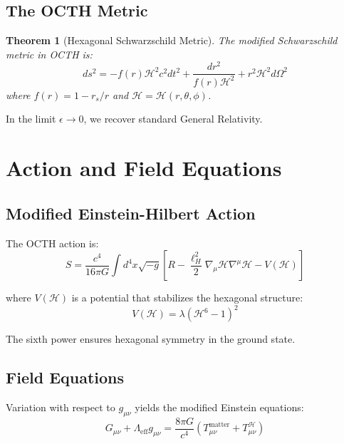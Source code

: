 \documentclass[12pt,a4paper]{article}
\newtheorem{theorem}{Theorem}
\begin{document}
\subsection{The OCTH Metric}

\begin{theorem}[Hexagonal Schwarzschild Metric]
The modified Schwarzschild metric in OCTH is:
\begin{equation}
    \boxed{ds^2 = -f(r)\mathcal{H}^2 c^2 dt^2 + \frac{dr^2}{f(r)\mathcal{H}^2} + r^2 \mathcal{H}^2 d\Omega^2}
\end{equation}
where $f(r) = 1 - r_s/r$ and $\mathcal{H} = \mathcal{H}(r,\theta,\phi)$.
\end{theorem}

In the limit $\epsilon \to 0$, we recover standard General Relativity.

\section{Action and Field Equations}

\subsection{Modified Einstein-Hilbert Action}

The OCTH action is:
\begin{equation}
    S = \frac{c^4}{16\pi G}\int d^4x \sqrt{-g}\left[R - \frac{\ell_H^2}{2}\nabla_\mu\mathcal{H}\nabla^\mu\mathcal{H} - V(\mathcal{H})\right]
\end{equation}

where $V(\mathcal{H})$ is a potential that stabilizes the hexagonal structure:
\begin{equation}
    V(\mathcal{H}) = \lambda(\mathcal{H}^6 - 1)^2
\end{equation}

The sixth power ensures hexagonal symmetry in the ground state.

\subsection{Field Equations}

Variation with respect to $g_{\mu\nu}$ yields the modified Einstein equations:
\begin{equation}
    G_{\mu\nu} + \Lambda_{\text{eff}} g_{\mu\nu} = \frac{8\pi G}{c^4}\left(T_{\mu\nu}^{\text{matter}} + T_{\mu\nu}^{\mathcal{H}}\right)
\end{equation}
\end{document}
